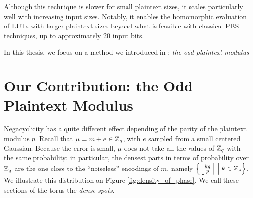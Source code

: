 Although this technique is slower for small plaintext sizes, it scales particularly well with increasing input sizes. Notably, it enables the homomorphic evaluation of LUTs with larger plaintext sizes beyond what is feasible with classical PBS techniques, up to approximately 20 input bits.


In this thesis, we focus on a method we introduced in \cite{TCHES:BonPoiRiv24}: \textit{the odd plaintext modulus}

\section{Our Contribution: the Odd Plaintext Modulus}
\label{sec:odd_modulus}

Negacyclicity has a quite different effect depending of the parity of the plaintext modulus $p$. Recall that $\mu = m + e \in \mathbb{Z}_q$, with $e$ sampled from a small centered Gaussian. Because the error is small, $\mu$ does not take all the values of $\mathbb{Z}_q$ with the same probability: in particular, the densest parts in terms of probability over $\mathbb{Z}_q$ are the one close to the ``noiseless'' encodings of $m$, namely $\left \{ \left \lfloor \frac {k q}{p} \right \rceil ~\middle |~ k \in \mathbb{Z}_p \right \}$. We illustrate this distribution on Figure \ref{fig:density_of_phase}. We call these sections of the torus the \emph{dense spots}.


